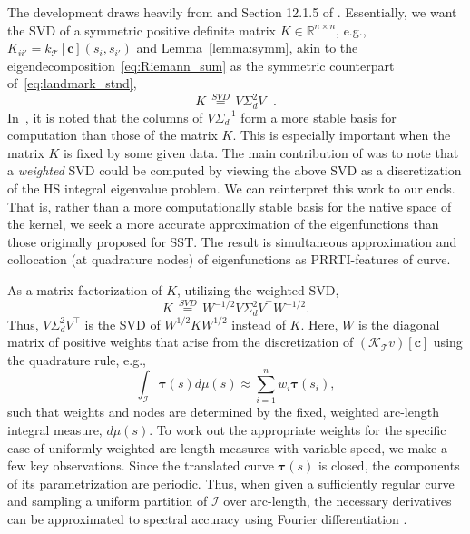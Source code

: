 \documentclass[pdflatex,iicol]{sn-jnl}%
\theoremstyle{thmstyleone}%
\theoremstyle{thmstyletwo}%
\theoremstyle{thmstylethree}%
\begin{document}
The development draws heavily from \cite{DeMarchi2013} and Section 12.1.5 of \cite{fasshauer2015kernel}. Essentially, we want the SVD of a symmetric positive definite matrix $K \in \mathbb{R}^{n \times n}$, e.g., $K_{ii'} = k_{\mathcal{T}}[\boldsymbol{c}](s_i,s_{i'})$ and Lemma~\ref{lemma:symm}, akin to the eigendecomposition~\eqref{eq:Riemann_sum} as the symmetric counterpart of~\eqref{eq:landmark_stnd}, 
\begin{equation} \label{eq:kernel_matrix}
    K \,\overset{SVD}{=}\, V \Sigma_d^2 V^{\top}.    
\end{equation}
In~\cite{DeMarchi2013,fasshauer2015kernel}, it is noted that the columns of $V\Sigma_d^{-1}$ form a more stable basis for computation than those of the matrix $K$. This is especially important when the matrix $K$ is fixed by some given data. The main contribution of \cite{DeMarchi2013} was to note that a \emph{weighted} SVD could be computed by viewing the above SVD as a discretization of the HS integral eigenvalue problem. We can reinterpret this work to our ends. That is, rather than a more computationally stable basis for the native space of the kernel, we seek a more accurate approximation of the eigenfunctions than those originally proposed for SST. The result is simultaneous approximation and collocation (at quadrature nodes) of eigenfunctions as PRRTI-features of curve.

As a matrix factorization of $K$, utilizing the weighted SVD,
\begin{equation}
    K \,\overset{SVD}{=}\, W^{-1/2}V\Sigma_d^2V^{\top}W^{-1/2}.
\end{equation}
Thus, $V\Sigma_d^2V^{\top}$ is the SVD of $W^{1/2}KW^{1/2}$ instead of $K$. Here, $W$ is the diagonal matrix of positive weights that arise from the discretization of  $(\mathcal{K}_{\mathcal{T}}v)[\boldsymbol{c}]$ using the quadrature rule, e.g.,
\begin{equation}\label{eq:quad}
    \int_{\mathcal{I}} \boldsymbol{\tau}(s) d\mu(s)  \approx \sum_{i = 1}^nw_i \boldsymbol{\tau}(s_i),
\end{equation}
such that weights and nodes are determined by the fixed, weighted arc-length integral measure, $d\mu(s)$. To work out the appropriate weights for the specific case of uniformly weighted arc-length measures with variable speed, we make a few key observations. Since the translated curve $\boldsymbol{\tau}(s)$ is closed, the components of its parametrization are periodic. Thus, when given a sufficiently regular curve and sampling a uniform partition of $\mathcal{I}$ over arc-length, the necessary derivatives can be approximated to spectral accuracy using Fourier differentiation \cite{trefethen2000}. 
\end{document}
